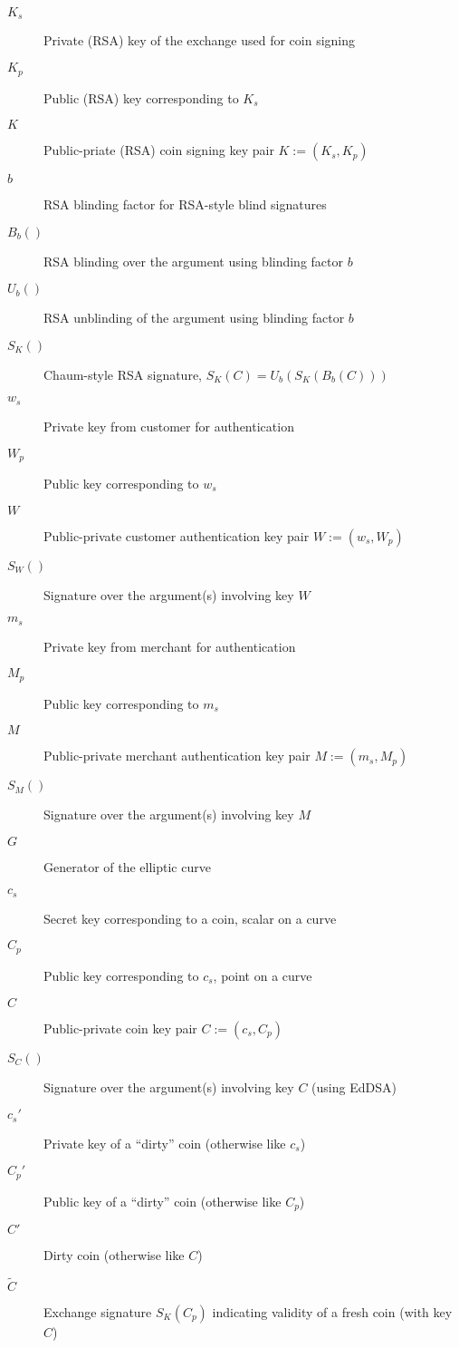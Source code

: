 \documentclass{llncs}
\begin{document}
\begin{description}
  \item[$K_s$]{Private (RSA) key of the exchange used for coin signing}
  \item[$K_p$]{Public (RSA) key corresponding to $K_s$}
  \item[$K$]{Public-priate (RSA) coin signing key pair $K := (K_s, K_p)$}
  \item[$b$]{RSA blinding factor for RSA-style blind signatures}
  \item[$B_b()$]{RSA blinding over the argument using blinding factor $b$}
  \item[$U_b()$]{RSA unblinding of the argument using blinding factor $b$}
  \item[$S_K()$]{Chaum-style RSA signature, $S_K(C) = U_b(S_K(B_b(C)))$}
  \item[$w_s$]{Private key from customer for authentication}
  \item[$W_p$]{Public key corresponding to $w_s$}
  \item[$W$]{Public-private customer authentication key pair $W := (w_s, W_p)$}
  \item[$S_W()$]{Signature over the argument(s) involving key $W$}
  \item[$m_s$]{Private key from merchant for authentication}
  \item[$M_p$]{Public key corresponding to $m_s$}
  \item[$M$]{Public-private merchant authentication key pair $M := (m_s, M_p)$}
  \item[$S_M()$]{Signature over the argument(s) involving key $M$}
  \item[$G$]{Generator of the elliptic curve}
  \item[$c_s$]{Secret key corresponding to a coin, scalar on a curve}
  \item[$C_p$]{Public key corresponding to $c_s$, point on a curve}
  \item[$C$]{Public-private coin key pair $C := (c_s, C_p)$}
  \item[$S_{C}()$]{Signature over the argument(s) involving key $C$ (using EdDSA)}
  \item[$c_s'$]{Private key of a ``dirty'' coin (otherwise like $c_s$)}
  \item[$C_p'$]{Public key of a ``dirty'' coin (otherwise like $C_p$)}
  \item[$C'$]{Dirty coin (otherwise like $C$)}
  \item[$\widetilde{C}$]{Exchange signature $S_K(C_p)$ indicating validity of a fresh coin (with key $C$)}

\end{description}
\end{document}
